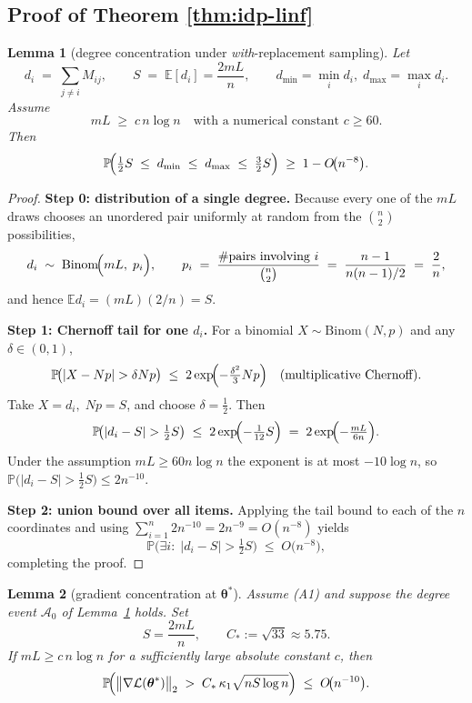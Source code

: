 \documentclass[letterpaper,12pt]{article}
\numberwithin{equation}{section}
\theoremstyle{plain}
\numberwithin{Theorem}{section}
\numberwithin{corollary}{section}
\numberwithin{proposition}{section}
\newtheorem{Lemma}{Lemma}
\numberwithin{Lemma}{section}
{
	\theoremstyle{definition}
	\newtheorem{Definition}{Definition}
	\newtheorem{example}{Example}
	\numberwithin{example}{section}
	\newtheorem{fact}{Fact}
	\numberwithin{fact}{section}
	\newtheorem{remark}{Remark}
}
\newcommand{\Pro}{\mathbb{P}}
\newcommand{\1}{\mathbbm{1}}
\def\bth{{\boldsymbol{\theta}}}
\def\E{\mathbb{E}}
\begin{document}
\subsection{Proof of Theorem \ref{thm:idp-linf}}

\begin{Lemma}[degree concentration under \textit{with}-replacement sampling]
	\label{lem:degree}
	Let
	\[
	d_i \;=\;\sum_{j\ne i}M_{ij}, 
	\qquad
	S \;=\; \E[d_i]= \frac{2mL}{n},
	\qquad
	d_{\min}=\min_{i}d_i,\;d_{\max}=\max_{i}d_i .
	\]
	Assume
	\[
	mL \;\ge\; c\,n\log n
	\quad\text{with a numerical constant }c\ge 60 .
	\]
	Then
	\[
	\Pro\!\Bigl(
	\tfrac12 S \;\le\; d_{\min}\;\le\; d_{\max}\;\le\; \tfrac32 S
	\Bigr)
	\;\ge\; 1-O\!\bigl(n^{-8}\bigr).
	\]
\end{Lemma}

\begin{proof}
	\textbf{Step 0: distribution of a single degree.}
	Because every one of the \(mL\) draws chooses an unordered pair
	uniformly at random from the \(\binom{n}{2}\) possibilities,
	\[
	d_i \;\sim\;
	\mathrm{Binom}\!\Bigl(mL,\;p_i\Bigr),
	\qquad
	p_i \;=\; \frac{\#\text{pairs involving }i}{\binom{n}{2}}
	\;=\;\frac{n-1}{n(n-1)/2}
	\;=\;\frac{2}{n},
	\]
	and hence \(\E d_i = (mL)(2/n)=S\).
	
	\medskip
	\noindent
	\textbf{Step 1: Chernoff tail for one \(d_i\).}
	For a binomial \(X\sim\mathrm{Binom}(N,p)\) and any
	\(\delta\in(0,1)\),
	\[
	\Pro\!\bigl(|X-Np|>\delta Np\bigr)
	\;\le\; 2\exp\!\Bigl(-\tfrac{\delta^{2}}{3}Np\Bigr)
	\quad
	\text{(multiplicative Chernoff).}
	\]
	Take \(X=d_i,\;Np=S\), and choose \(\delta=\tfrac12\).  Then
	\[
	\Pro\!\bigl(|d_i-S|>\tfrac12 S\bigr)
	\;\le\;
	2\exp\!\Bigl(-\tfrac{1}{12}S\Bigr)
	\;=\;
	2\exp\!\Bigl(-\tfrac{mL}{6n}\Bigr).
	\]
	Under the assumption \(mL\ge 60n\log n\) the exponent is at most
	\(-10\log n\), so
	\(
	\Pro\bigl(|d_i-S|>\tfrac12 S\bigr)\le 2n^{-10}.
	\)
	
	\medskip
	\noindent
	\textbf{Step 2: union bound over all items.}
	Applying the tail bound to each of the \(n\) coordinates and using
	\(\sum_{i=1}^{n}2n^{-10}=2n^{-9}=O(n^{-8})\) yields
	\[
	\Pro\!\bigl(
	\exists i:\;|d_i-S|>\tfrac12 S
	\bigr)
	\;\le\;O\!\bigl(n^{-8}\bigr),
	\]
	completing the proof.
\end{proof}


\begin{Lemma}[gradient concentration at $\bth^{*}$]
	\label{lem:grad}
	Assume \textnormal{(A1)} and suppose the degree event
	$\mathcal A_{0}$ of Lemma~\ref{lem:degree} holds.  Set
	\[
	S=\frac{2mL}{n},
	\qquad
	C_{*}:=\sqrt{33}\approx 5.75 .
	\]
	If $mL\ge c\,n\log n$ for a sufficiently large absolute constant\/
	$c$, then
	\[
	\Pro\!\Bigl(
	\bigl\|\nabla\mathcal L(\bth^{*})\bigr\|_{2}
	\;>\; C_{*}\,\kappa_{1}\sqrt{nS\log n}
	\Bigr)
	\;\le\; O\!\bigl(n^{-10}\bigr).
	\]
\end{Lemma}
\end{document}
